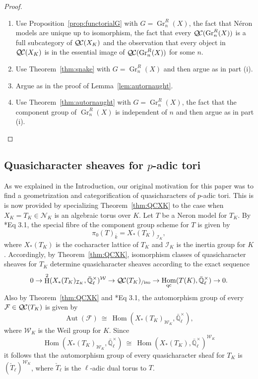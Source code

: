 \documentclass[10pt]{amsart}
\theoremstyle{plain}
\theoremstyle{definition}
\theoremstyle{remark}
\newcommand{\EE}{\mathbb{\bar Q}_\ell}
\newcommand{\bFq}{\bar{k}}
\newcommand{\EEx}{\EE^\times}
\newcommand{\Weil}[1]{\mathcal{W}_{#1}}
\DeclareMathOperator{\Aut}{Aut}
\DeclareMathOperator{\Hom}{Hom}
\DeclareMathOperator{\Gr}{Gr}
\DeclareMathOperator{\Hh}{H}
\newcommand{\iso}{{\ \cong\ }}
\newcommand{\qcs}[1]{{\mathcal{#1}}}
\newcommand{\QC}{{\mathcal{Q\hskip-0.8pt C}}}
\newcommand{\QCiso}[1]{\QC(#1)_{/\text{iso}}}
\begin{document}
\begin{proof}
\begin{enumerate}
\item Use Proposition~\ref{prop:functorialG} with $G = \Gr^R_n(X)$, the fact that N\'eron models are unique up to isomorphism, the fact that every $\QC(\Gr^R_n(X))$ is a full subcategory of $\QC(X_K)$ and the observation that every object in $\QC(X_K)$ is in the essential image of $\QC(\Gr^R_n(X))$ for some $n$.
\item Use Theorem~\ref{thm:snake} with $G = \Gr^R_n(X)$ and then argue as in part (i).
\item Argue as in the proof of Lemma~\ref{lem:autornaught}.
\item Use Theorem~\ref{thm:autornaught} with $G = \Gr^R_n(X)$, the fact that the component group of $\Gr^R_n(X)$ is independent of $n$ and then argue as in part (i).
\end{enumerate}
\end{proof}

\subsection{Quasicharacter sheaves for $p$-adic tori} \label{ssec:qc_tori}

As we explained in the Introduction, our original motivation for this paper was to find a geometrization and categorification of quasicharacters of $p$-adic tori. 
This is is now provided by specializing Theorem~\ref{thm:QCXK} to the case when $X_K= T_K\in \mathcal{N}_K$ is an algebraic torus over $K$. 
Let $T$ be a Neron model for $T_K$.
By \cite{bitan:discriminant}*{Eq 3.1}, the special fibre of the component group scheme for $T$ is given by
\[
 \pi_0(T)_{\bFq} = X_*(T_K)_{\mathcal{I}_K},
\]
where $X_*(T_K)$ is the cocharacter lattice of $T_K$ and $\mathcal{I}_K$ is the inertia group for $K$.
Accordingly, by Theorem~\ref{thm:QCXK}, isomorphism classes of quasicharacter sheaves for $T_K$ determine quasicharacter sheaves according to the exact sequence
\[
0 \to \Hh^2(X_*(T_K)_{\mathcal{I}_K},\EEx)^{\Weil{}} \to \QCiso{T_K} \to \Hom_\text{qc}(T(K),\EEx) \to 0.
\]
Also by Theorem~\ref{thm:QCXK} and \cite{bitan:discriminant}*{Eq 3.1}, the automorphism group of every $\qcs{F} \in \QC(T_K)$ is given by 
\[
\Aut(\qcs{F}) \iso \Hom(X_*(T_K)_{\Weil{K}},\EEx),
\]
where $\Weil{K}$ is the Weil group for $K$. 
Since 
\[
\Hom(X_*(T_K)_{\Weil{K}},\EEx) \iso \Hom(X_*(T_K),\EEx)^{\Weil{K}}
\]
it follows that the automorphism group of every quasicharacter sheaf for $T_K$ is $(\check{T}_\ell)^{\Weil{K}}$, where $\check{T}_\ell$ is the $\ell$-adic dual torus to $T$.
\end{document}
